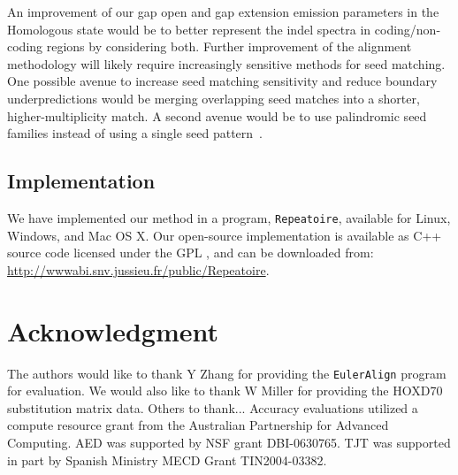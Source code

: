 \documentclass[12pt,journal,draftcls,letterpaper,onecolumn]{IEEEtran}
\begin{document}
An improvement of our gap open and gap extension emission parameters in the Homologous state would be to better represent the indel spectra in coding/non-coding regions by considering both. Further improvement of the alignment methodology will likely require increasingly sensitive methods for
seed matching. One possible avenue to increase seed matching sensitivity and reduce boundary underpredictions would be merging overlapping seed matches into a
shorter, higher-multiplicity match.  A second avenue would be to use palindromic seed families instead of using a single seed pattern~\cite{ref-pattern}.

\subsection*{Implementation}
We have implemented our method in a program, \texttt{Repeatoire},
available for Linux, Windows, and Mac OS X. Our open-source
implementation is available as C++ source code licensed under the GPL , and can be downloaded from: \\
\url{http://wwwabi.snv.jussieu.fr/public/Repeatoire}.

\section{ Acknowledgment }
The authors would like to thank Y Zhang for providing the
\texttt{EulerAlign} program for evaluation. We would also like to thank
W Miller for providing the HOXD70 substitution matrix data. Others to thank... Accuracy
evaluations utilized a compute resource grant from the Australian
Partnership for Advanced Computing.  AED was supported by NSF grant
DBI-0630765. TJT was supported in part by Spanish Ministry MECD Grant
TIN2004-03382.



%
%
%
\end{document}
